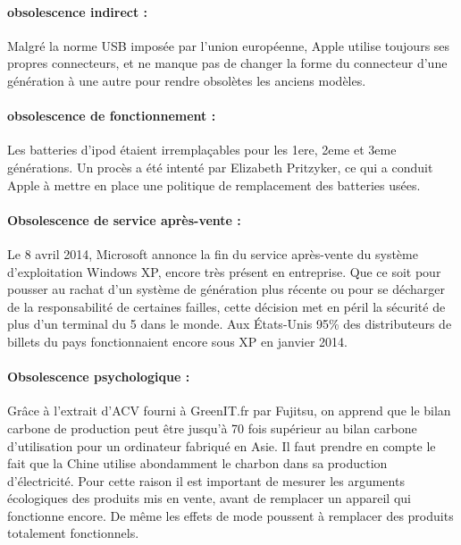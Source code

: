 \paragraph*{obsolescence indirect :}

Malgré la norme USB imposée par l’union européenne, Apple utilise toujours ses propres connecteurs, et ne manque pas de changer la forme du connecteur d’une génération à une autre pour rendre obsolètes les anciens modèles.

\paragraph*{obsolescence de fonctionnement :}

Les batteries d’ipod étaient irremplaçables pour les 1ere, 2eme et 3eme générations. Un procès a été intenté par Elizabeth Pritzyker, ce qui a conduit Apple à mettre en place une politique de remplacement des batteries usées.

\paragraph*{Obsolescence de service après-vente :}

Le 8 avril 2014, Microsoft annonce la fin du service après-vente du système d’exploitation Windows XP, encore très présent en entreprise. Que ce soit pour pousser au rachat d’un système de génération plus récente ou pour se décharger de la responsabilité de certaines failles, cette décision met en péril la sécurité de plus d'un terminal du 5 dans le monde. Aux États-Unis 95\% des distributeurs de billets du pays fonctionnaient encore sous XP en janvier 2014.


\paragraph*{Obsolescence psychologique :}

Grâce à l’extrait d’ACV fourni à GreenIT.fr par Fujitsu, on apprend que le bilan carbone de production peut être jusqu’à 70 fois supérieur au bilan carbone d’utilisation pour un ordinateur fabriqué en Asie. Il faut prendre en compte le fait que la Chine utilise abondamment le charbon dans sa production d'électricité. Pour cette raison il est important de mesurer les arguments écologiques des produits mis en vente, avant de remplacer un appareil qui fonctionne encore. De même les effets de mode poussent à remplacer des produits totalement fonctionnels.

